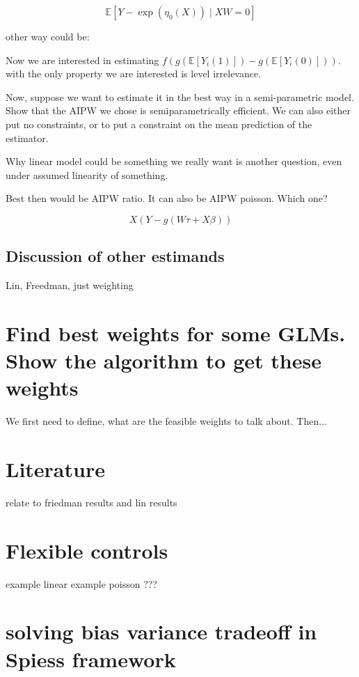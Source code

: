 \documentclass[a4paper,12pt]{article}
\theoremstyle{plain}
\theoremstyle{plain}
\begin{document}
\[\mathbb{E}[Y - \exp(\eta_0(X))  \mid X W = 0]\]

other way could be:



Now we are interested in estimating $f(g(\mathbb{E}[Y_i(1)]) - g(\mathbb{E}[Y_i(0)]))$. with the only property we are interested is level irrelevance.

Now, suppose we want to estimate it in the best way in a semi-parametric model. Show that the AIPW we chose is semiparametrically efficient. We can also either put no constraints, or to put a constraint on the mean prediction of the estimator.

Why linear model could be something we really want is another question, even under assumed linearity of something.

Best then would be AIPW ratio. It can also be AIPW poisson. Which one?




\[X(Y - g(W \tau + X \beta))\]


\subsection{Discussion of other estimands}

Lin, Freedman, just weighting

\section{Find best weights for some GLMs. Show the algorithm to get these weights}

We first need to define, what are the feasible weights to talk about.
Then...

\section{Literature}

relate to friedman results and lin results

\section{Flexible controls}

example linear
example poisson
???


\section{solving bias variance tradeoff in Spiess framework}
\end{document}
